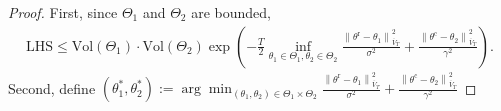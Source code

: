 \documentclass[accepted]{uai2025} %
\theoremstyle{plain}
\theoremstyle{definition}
\theoremstyle{remark}
\newcommand{\truethetac}{\theta^{\mathrm{c}}}
\newcommand{\truethetar}{\theta^{\mathrm{r}}}
\def\cd{\cdot}
\begin{document}
\begin{proof}
    First, since $\Theta_1$ and $\Theta_2$ are bounded, 
    \begin{align}
        \mathrm{LHS}\le \text{Vol}(\Theta_1) \cd \text{Vol}(\Theta_2) \exp\left( -\frac{T}{2} \inf_{\theta_1 \in \Theta_1, \theta_2 \in \Theta_2} \frac{\left\| \truethetar - \theta_1 \right\|^2_{\overline{V}_T}}{\sigma^2}+\frac{\left\| \truethetac - \theta_2 \right\|^2_{\overline{V}_T}}{\gamma^2} \right).\nonumber
    \end{align}
    Second, define $(\theta^*_1, \theta^*_2):=\arg\min
_{(\theta_1,\theta_2) \in \Theta_1\times \Theta_2} \frac{\left\| \truethetar - \theta_1 \right\|^2_{\overline{V}_T}}{\sigma^2}+\frac{\left\| \truethetac - \theta_2 \right\|^2_{\overline{V}_T}}{\gamma^2} $


\end{proof}
\end{document}
